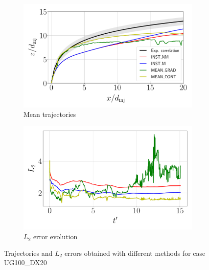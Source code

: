 \begin{figure}[ht]
\centering
\begin{subfigure}[b]{0.45\textwidth}
	\centering
   \includegraphics[scale=0.15]{./part2_developments/figures_ch5_resolved_JICF/results_trajectories/methods_comparison_trajectories_q6uG100_dx20.pdf}
   \caption{Mean trajectories}
\end{subfigure}
\hspace{0.25in}
\begin{subfigure}[b]{0.45\textwidth}
	\centering
   \includegraphics[scale=0.15]{./part2_developments/figures_ch5_resolved_JICF/results_trajectories/methods_comparison_L2_evolution_q6uG100_dx20.pdf}
   \caption{$L_2$ error evolution}
\end{subfigure}
\caption{Trajectories and $L_2$ errors obtained with different methods for case UG100\_DX20}
\label{fig:JICF_trajectories_and_L2_comparison}
\end{figure}

